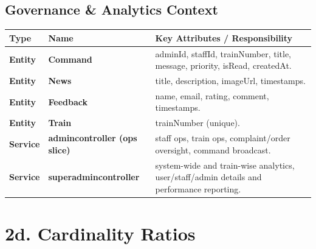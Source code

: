 \documentclass[12pt,a4paper]{report}
\begin{document}
\subsection{Governance \& Analytics Context}
\begin{table}[H]
\centering
\begin{tabularx}{\textwidth}{>{\bfseries}p{} >{\bfseries}p{} Y}
\toprule
{}
\textcolor{TableHeaderText}{Type} & \textcolor{TableHeaderText}{Name} & \textcolor{TableHeaderText}{Key Attributes / Responsibility} \\
\midrule
Entity & Command & adminId, staffId, trainNumber, title, message, priority, isRead, createdAt. \\
Entity & News & title, description, imageUrl, timestamps. \\
Entity & Feedback & name, email, rating, comment, timestamps. \\
Entity & Train & trainNumber (unique). \\
Service & admincontroller (ops slice) & staff ops, train ops, complaint/order oversight, command broadcast. \\
Service & superadmincontroller & system-wide and train-wise analytics, user/staff/admin details and performance reporting. \\
\bottomrule
\end{tabularx}
\end{table}

\section{2d. Cardinality Ratios}
\end{document}
